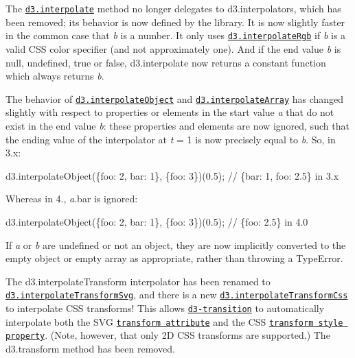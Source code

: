 The \href{https://github.com/d3/d3-interpolate/blob/master/README.md#interpolate}{\tt d3.\+interpolate} method no longer delegates to d3.\+interpolators, which has been removed; its behavior is now defined by the library. It is now slightly faster in the common case that {\itshape b} is a number. It only uses \href{https://github.com/d3/d3-interpolate/blob/master/README.md#interpolateRgb}{\tt d3.\+interpolate\+Rgb} if {\itshape b} is a valid C\+SS color specifier (and not approximately one). And if the end value {\itshape b} is null, undefined, true or false, d3.\+interpolate now returns a constant function which always returns {\itshape b}.

The behavior of \href{https://github.com/d3/d3-interpolate/blob/master/README.md#interpolateObject}{\tt d3.\+interpolate\+Object} and \href{https://github.com/d3/d3-interpolate/blob/master/README.md#interpolateArray}{\tt d3.\+interpolate\+Array} has changed slightly with respect to properties or elements in the start value {\itshape a} that do not exist in the end value {\itshape b}\+: these properties and elements are now ignored, such that the ending value of the interpolator at {\itshape t} = 1 is now precisely equal to {\itshape b}. So, in 3.\+x\+:


\begin{DoxyCode}
d3.interpolateObject(\{foo: 2, bar: 1\}, \{foo: 3\})(0.5); // \{bar: 1, foo: 2.5\} in 3.x
\end{DoxyCode}


Whereas in 4., {\itshape a}.bar is ignored\+:


\begin{DoxyCode}
d3.interpolateObject(\{foo: 2, bar: 1\}, \{foo: 3\})(0.5); // \{foo: 2.5\} in 4.0
\end{DoxyCode}


If {\itshape a} or {\itshape b} are undefined or not an object, they are now implicitly converted to the empty object or empty array as appropriate, rather than throwing a Type\+Error.

The d3.\+interpolate\+Transform interpolator has been renamed to \href{https://github.com/d3/d3-interpolate/blob/master/README.md#interpolateTransformSvg}{\tt d3.\+interpolate\+Transform\+Svg}, and there is a new \href{https://github.com/d3/d3-interpolate/blob/master/README.md#interpolateTransformCss}{\tt d3.\+interpolate\+Transform\+Css} to interpolate C\+SS transforms! This allows \href{#transitions-d3-transition}{\tt d3-\/transition} to automatically interpolate both the S\+VG \href{https://www.w3.org/TR/SVG/coords.html#TransformAttribute}{\tt transform attribute} and the C\+SS \href{https://www.w3.org/TR/css-transforms-1/#transform-property}{\tt transform style property}. (Note, however, that only 2D C\+SS transforms are supported.) The d3.\+transform method has been removed.

